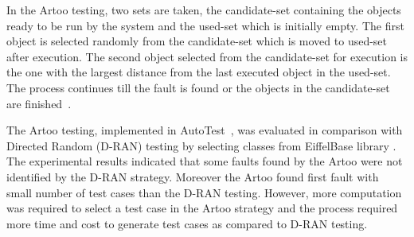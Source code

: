 In the Artoo testing, two sets are taken, the candidate-set containing the objects ready to be run by the system and the used-set which is initially empty. The first object is selected randomly from the candidate-set which is moved to used-set after execution. The second object selected from the candidate-set for execution is the one with the largest distance from the last executed object in the used-set. The process continues till the fault is found or the objects in the candidate-set are finished~\cite{ciupa2006object}.

The Artoo testing, implemented in AutoTest~\cite{ciupa2008artoo}, was evaluated in comparison with Directed Random (D-RAN) testing \cite{godefroid2005dart} by selecting classes from EiffelBase library \cite{meyer1987eiffel}. The experimental results indicated that some faults found by the Artoo were not identified by the D-RAN strategy. Moreover the Artoo found first fault with small number of test cases than the D-RAN testing. However, more computation was required to select a test case in the Artoo strategy and the process required more time and cost to generate test cases as compared to D-RAN testing.


